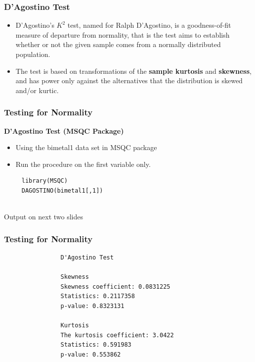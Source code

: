 \documentclass{beamer}
\begin{document}
\begin{frame}
\frametitle{D'Agostino Test}
\Large
\begin{itemize}
\item D’Agostino’s $K^2$ test, named for Ralph D'Agostino, is a goodness-of-fit measure of departure from normality, that is the test aims to establish whether or not the given sample comes from a normally distributed population. 
\item The test is based on transformations of the \textbf{sample kurtosis} and \textbf{skewness}, and has power only against the alternatives that the distribution is skewed and/or kurtic.
\end{itemize}
\end{frame}
\begin{frame}[fragile]
\frametitle{Testing for Normality}
\noindent	\textbf{D'Agostino Test (MSQC Package)}
			\begin{itemize}
				\item Using the bimetal1 data set in MSQC package
\item Run the procedure on the first variable only.
			\end{itemize}
			\begin{framed}
				\begin{verbatim}
	 library(MSQC)
	 DAGOSTINO(bimetal1[,1])
				
			\end{verbatim}
			\end{framed}
			Output on next two slides
\end{frame}
				\begin{frame}[fragile]
				\frametitle{Testing for Normality}
				\begin{framed}
				\begin{verbatim}
				D'Agostino Test
				
				Skewness
				Skewness coefficient: 0.0831225 
				Statistics: 0.2117358 
				p-value: 0.8323131 
				
				Kurtosis
				The kurtosis coefficient: 3.0422 
				Statistics: 0.591983 
				p-value: 0.553862 
						\end{verbatim}
					\end{framed}
				\end{frame}
\end{document}
